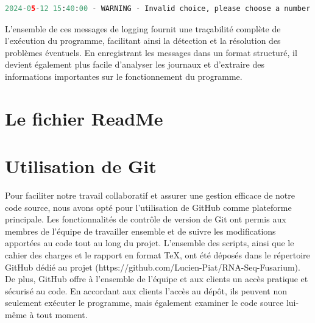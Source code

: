 \begin{lstlisting}[language=Python, breaklines=true]
2024-05-12 15:40:00 - WARNING - Invalid choice, please choose a number between 1 and 4
\end{lstlisting}

L'ensemble de ces messages de logging fournit une traçabilité complète de l'exécution du programme, facilitant ainsi la détection et la résolution des problèmes éventuels. En enregistrant les messages dans un format structuré, il devient également plus facile d'analyser les journaux et d'extraire des informations importantes sur le fonctionnement du programme.

\section{Le fichier ReadMe}


\section{Utilisation de Git}

Pour faciliter notre travail collaboratif et assurer une gestion efficace de notre code source, nous avons opté pour l'utilisation de GitHub comme plateforme principale. Les fonctionnalités de contrôle de version de Git ont permis aux membres de l’équipe de travailler ensemble et de suivre les modifications apportées au code tout au long du projet. L'ensemble des scripts, ainsi que le cahier des charges et le rapport en format TeX, ont été déposés dans le répertoire GitHub dédié au projet (https://github.com/Lucien-Piat/RNA-Seq-Fusarium). De plus, GitHub offre à l'ensemble de l'équipe et aux clients un accès pratique et sécurisé au code. En accordant aux clients l'accès au dépôt, ils peuvent non seulement exécuter le programme, mais également examiner le code source lui-même à tout moment.
